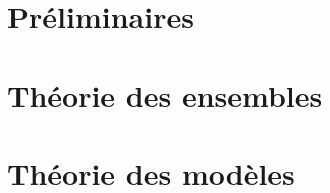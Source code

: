 \documentclass[11pt, a4paper, french]{book}
\begin{document}
	
	
	
	
	
	
	
	\mainmatter
	
	
	
	\part{Préliminaires}
	
	

	

        

        

        


        \part{Théorie des ensembles}

        
	
	
	\part{Théorie des modèles}
	
	
	
	
	
	
	\backmatter
	
	
	
	
	
	
	
	\printbibliography[%
		heading = bibintoc,%
	]
	
	
	
	\printindex
	\printindex[notation]
	\printindex[person]
	
	
	
\end{document}
